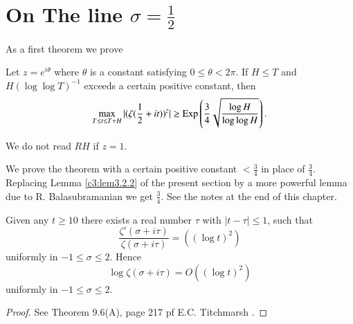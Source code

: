 \section{On The line $\sigma =\frac{1}{2}$}\label{c3:sec3.2}
 As a first theorem we prove

\begin{theorem}[on RH]\label{c3:thm3.2.1}
Let $z = e^{i\theta}$ where $\theta$ is a constant satisfying $0\leq \theta < 2\pi$. If $H \leq T$ and $H(\log \log T)^{-1}$ exceeds a certain positive constant, then
$$
\max\limits_{T \leq t \leq T + H} |(\zeta(\frac{1}{2} + it))^z| \geq \operatorname{Exp} \left(\frac{3}{4} \sqrt{\frac{\log H}{\log \log H}} \right).
$$
\end{theorem}

\setcounter{remark}{0}
\begin{remark}%
We do not read $RH$ if $z =1$.
\end{remark}

\begin{remark}%
We prove the theorem with a certain positive constant $< \frac{3}{4}$ in place of $\frac{3}{4}$. Replacing Lemma \ref{c3:lem3.2.2} of the present section by a more powerful lemma due to R. Balasubramanian we get $\frac{3}{4}$. See the notes at the end of this chapter.
\end{remark}

\begin{sublemma}\label{c3:lem3.2.1}
Given any $t \geq 10$ there exists a real number $\tau$ with $|t-\tau| \leq 1$, such that 
\begin{equation*}
\frac{\zeta'(\sigma + i\tau)}{\zeta(\sigma + i\tau)} = ((\log t)^2) \tag{3.2.1}\label{c3:eq3.2.1}
\end{equation*}
uniformly in $-1 \leq \sigma \leq 2$. Hence
\begin{equation*}
\log \zeta (\sigma + i\tau) = O ((\log t)^2) \tag{3.2.2}\label{c3:eq3.2.2}
\end{equation*}
uniformly in $-1 \leq \sigma \leq 2$.
\end{sublemma}

\begin{proof}
See Theorem 9.6(A), page 217 pf E.C. Titchmarsh \cite{Titchmarsh1}.
\end{proof}

